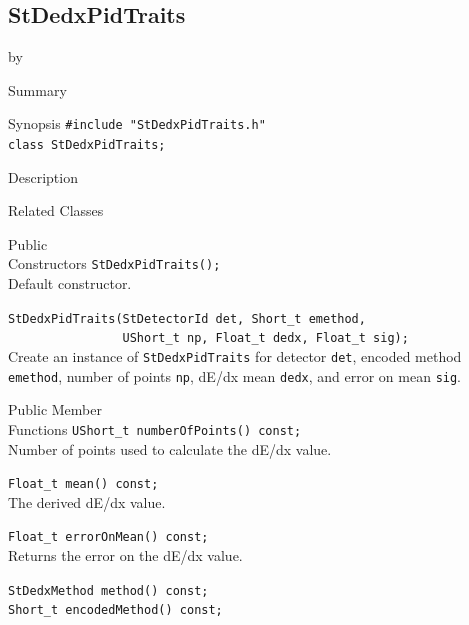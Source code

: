\documentclass[twoside]{article}
\newcommand{\entrylabel}[1]{\mbox{\textbf{{#1}}}\hfil}%
\newenvironment{entry}
{\begin{list}{}%
    {\renewcommand{\makelabel}{\entrylabel}%
     \setlength{\labelwidth}{90pt}%
     \setlength{\leftmargin}{\labelwidth}
     \advance\leftmargin by \labelsep%
      }%
    }%
  {\end{list}}
\newcommand{\Entrylabel}[1]%
{\raisebox{0pt}[1ex][0pt]{\makebox[\labelwidth][l]%
    {\parbox[t]{\labelwidth}{\hspace{0pt}\textbf{{#1}}}}}}
\newenvironment{Entry}%
{\renewcommand{\entrylabel}{\Entrylabel}\begin{entry}}%
  {\end{entry}}
\begin{document}
\subsection{StDedxPidTraits}
\label{sec:StDedxPidTraits}
\begin{Entry}
\item[Summary]
\item[Synopsis]
    \verb+#include "StDedxPidTraits.h"+\\
    \verb+class StDedxPidTraits;+\\
\item[Description]
\item[Related Classes]
\item[Public\\ Constructors]
    \verb+StDedxPidTraits();+\\
    Default constructor.
    
    \verb+StDedxPidTraits(StDetectorId det, Short_t emethod,+\\
    \verb+                UShort_t np, Float_t dedx, Float_t sig);+\\
    Create an instance of \texttt{StDedxPidTraits} for detector
    \texttt{det}, encoded method \texttt{emethod}, number of points
    \texttt{np}, dE/dx mean \texttt{dedx}, and error on mean \texttt{sig}.
    
\item[Public Member\\ Functions]
    \verb+UShort_t numberOfPoints() const;+\\
    Number of points used to calculate the dE/dx value.
    
    \verb+Float_t mean() const;+\\
    The derived dE/dx value.
    
    \verb+Float_t errorOnMean() const;+\\
    Returns the error on the dE/dx value.
    
    \verb+StDedxMethod method() const;+\\    

    \verb+Short_t encodedMethod() const;+\\
\end{Entry}
\clearpage
\end{document}
